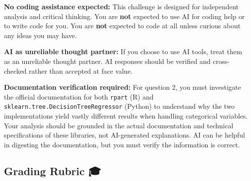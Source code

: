 \documentclass[
  letterpaper,
  DIV=11,
  numbers=noendperiod]{scrartcl}
\begin{document}
\begin{tcolorbox}[enhanced jigsaw, colbacktitle=quarto-callout-important-color!10!white, toptitle=1mm, colframe=quarto-callout-important-color-frame, breakable, rightrule=.15mm, arc=.35mm, bottomtitle=1mm, titlerule=0mm, opacityback=0, title=\textcolor{quarto-callout-important-color}{\faExclamation}\hspace{0.5em}{📋 Important Note on AI Usage}, colback=white, bottomrule=.15mm, toprule=.15mm, leftrule=.75mm, coltitle=black, opacitybacktitle=0.6, left=2mm]

\textbf{No coding assistance expected:} This challenge is designed for
independent analysis and critical thinking. You are \textbf{not}
expected to use AI for coding help or to write code for you. You are
\textbf{not} expected to code at all unless curious about any ideas you
may have.

\textbf{AI as unreliable thought partner:} If you choose to use AI
tools, treat them as an unreliable thought partner. AI responses should
be verified and cross-checked rather than accepted at face value.

\textbf{Documentation verification required:} For question 2, you must
investigate the official documentation for both \texttt{rpart} (R) and
\texttt{sklearn.tree.DecisionTreeRegressor} (Python) to understand why
the two implementations yield vastly different results when handling
categorical variables. Your analysis should be grounded in the actual
documentation and technical specifications of these libraries, not
AI-generated explanations. AI can be helpful in digesting the
documentation, but you must verify the information is correct.

\end{tcolorbox}

\subsection{Grading Rubric 🎓}\label{grading-rubric}
\end{document}
